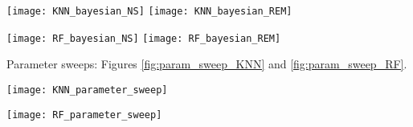 \begin{figure*}[h]
\texttt{[image: KNN\_bayesian\_NS]}
\texttt{[image: KNN\_bayesian\_REM]}
\caption{\label{fig:rocMDC_KNN}ROC curves of Bayesian probability marginalized for the 23 EoSs for MDC11 dataset using \ac{KNN} classifier.}
\end{figure*}

\begin{figure*}[h]
\texttt{[image: RF\_bayesian\_NS]}
\texttt{[image: RF\_bayesian\_REM]}
\caption{\label{fig:rocMDC_KNN}ROC curves of Bayesian probability marginalized for the 23 EoSs for MDC11 dataset using \ac{RF} classifier.}
\end{figure*}


Parameter sweeps:  Figures \ref{fig:param_sweep_KNN} and \ref{fig:param_sweep_RF}.

\begin{figure*}[h]
\texttt{[image: KNN\_parameter\_sweep]}
\caption{\label{fig:param_sweep_KNN}.}
\end{figure*}

\begin{figure*}[h]
\texttt{[image: RF\_parameter\_sweep]}
\caption{\label{fig:param_sweep_RF}.}
\end{figure*}



%





